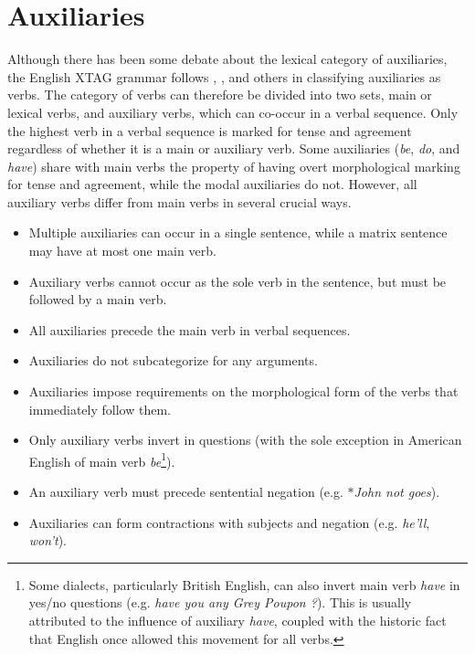 \chapter{Auxiliaries}
\label{auxiliaries}

Although there has been some debate about the lexical category of auxiliaries,
the English XTAG grammar follows \cite{mccawley88}, \cite{haegeman91}, and
others in classifying auxiliaries as verbs. The category of verbs can therefore
be divided into two sets, main or lexical verbs, and auxiliary verbs, which can
co-occur in a verbal sequence.  Only the highest verb in a verbal sequence is
marked for tense and agreement regardless of whether it is a main or auxiliary
verb.  Some auxiliaries ({\it be}, {\it do}, and {\it have}) share with main
verbs the property of having overt morphological marking for tense and
agreement, while the modal auxiliaries do not.  However, all auxiliary verbs
differ from main verbs in several crucial ways.

\begin{itemize}

\item Multiple auxiliaries can occur in a single sentence, while a matrix
sentence may have at most one main verb. 

\item Auxiliary verbs cannot occur as the sole verb in the sentence, but must
be followed by a main verb.

\item All auxiliaries precede the main verb in verbal sequences.

\item Auxiliaries do not subcategorize for any arguments.

\item Auxiliaries impose requirements on the morphological form of the verbs
that immediately follow them.

\item Only auxiliary verbs invert in questions (with the sole exception in 
American English of main verb {\it be}\footnote{Some dialects, particularly
British English, can also invert main verb {\it have} in yes/no questions
(e.g. {\it have you any Grey Poupon ?}).  This is usually attributed to the
influence of auxiliary {\it have}, coupled with the historic fact that English
once allowed this movement for all verbs.\label{have-footnote}}).

\item An auxiliary verb must precede sentential negation (e.g. $\ast${\it John not goes}).

\item Auxiliaries can form contractions with subjects and negation (e.g. {\it
he'll}, {\it won't}).

\end{itemize}

